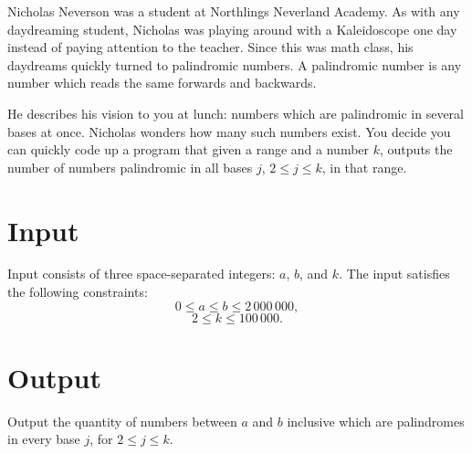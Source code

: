 
Nicholas Neverson was a student at Northlings Neverland Academy. As with any
daydreaming student, Nicholas was playing around with a Kaleidoscope one day
instead of paying attention to the teacher. Since this was math class, his
daydreams quickly turned to palindromic numbers. A palindromic number is any number
which reads the same forwards and backwards.

He describes his vision to you at lunch: numbers which are palindromic in
several bases at once. Nicholas wonders how many such numbers exist.
You decide you can quickly code up a
program that given a range and a number $k$, outputs the number of numbers
palindromic in all bases $j$, $2 \leq j \leq k$, in that range.

\section*{Input}

Input consists of three space-separated integers: $a$, $b$, and $k$. The input satisfies the following constraints:
\[
0 \leq a \leq b \leq 2\,000\,000,
\]
\[
2 \leq k \leq 100\,000.
\]

\section*{Output}

Output the quantity of numbers between $a$ and $b$ inclusive which are
palindromes in every base $j$, for $2 \leq j \leq k$.
